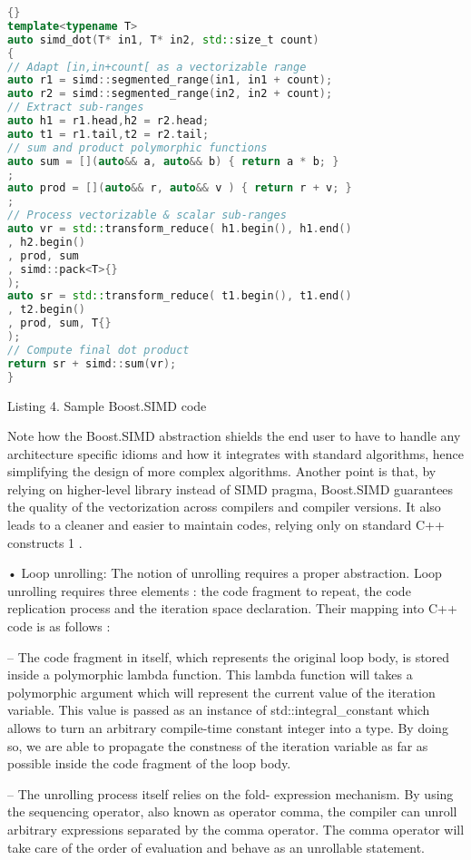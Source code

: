 \documentclass[../../main.tex]{subfiles}
\begin{document}
\begin{lstlisting}[language=c++]{}
template<typename T>
auto simd_dot(T* in1, T* in2, std::size_t count)
{
// Adapt [in,in+count[ as a vectorizable range
auto r1 = simd::segmented_range(in1, in1 + count);
auto r2 = simd::segmented_range(in2, in2 + count);
// Extract sub-ranges
auto h1 = r1.head,h2 = r2.head;
auto t1 = r1.tail,t2 = r2.tail;
// sum and product polymorphic functions
auto sum = [](auto&& a, auto&& b) { return a * b; }
;
auto prod = [](auto&& r, auto&& v ) { return r + v; }
;
// Process vectorizable & scalar sub-ranges
auto vr = std::transform_reduce( h1.begin(), h1.end()
, h2.begin()
, prod, sum
, simd::pack<T>{}
);
auto sr = std::transform_reduce( t1.begin(), t1.end()
, t2.begin()
, prod, sum, T{}
);
// Compute final dot product
return sr + simd::sum(vr);
}
\end{lstlisting}
Listing 4. Sample Boost.SIMD code

Note how the Boost.SIMD abstraction shields the end
user to have to handle any architecture specific idioms
and how it integrates with standard algorithms, hence
simplifying the design of more complex algorithms.
Another point is that, by relying on higher-level library
instead of SIMD pragma, Boost.SIMD guarantees
the quality of the vectorization across compilers and
compiler versions. It also leads to a cleaner and easier to
maintain codes, relying only on standard C++ constructs 1 .

• Loop unrolling: The notion of unrolling requires
a proper abstraction. Loop unrolling requires three
elements : the code fragment to repeat, the code
replication process and the iteration space declaration.
Their mapping into C++ code is as follows :

– The code fragment in itself, which represents
the original loop body, is stored inside a
polymorphic lambda function. This lambda
function will takes a polymorphic argument which
will represent the current value of the iteration
variable. This value is passed as an instance of
std::integral_constant which allows to
turn an arbitrary compile-time constant integer into
a type. By doing so, we are able to propagate the
constness of the iteration variable as far as possible
inside the code fragment of the loop body.

– The unrolling process itself relies on the fold-
expression mechanism. By using the sequencing
operator, also known as operator comma, the
compiler can unroll arbitrary expressions separated
by the comma operator. The comma operator will
take care of the order of evaluation and behave as
an unrollable statement.
\end{document}

